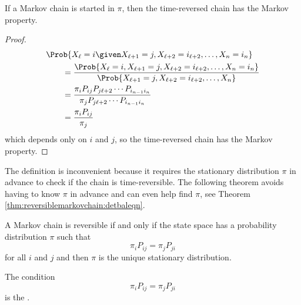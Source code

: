 \documentclass[12pt]{article}
\begin{document}
\begin{proposition}
    If a Markov chain is started in \( \pi \), then the time-reversed
    chain has the Markov property.
\end{proposition}

\begin{proof}
    \begin{align*}
        & \Prob{X_\ell = i \given X_{\ell+1} = j, X_{\ell+2} = i_{\ell+2},
        \dots, X_n = i_n} \\
        &\qquad = \frac{\Prob{X_\ell = i, X_{\ell+1} = j, X_{\ell+2} = i_
        {\ell+2}, \dots, X_n = i_n}}{\Prob{X_{\ell+1} = j, X_{\ell+2} =
        i_{\ell+2}, \dots, X_n}} \\
        &\qquad = \frac{\pi_i P_{ij}P_{j \ell+2}\cdots P_{i_{n-1} i_n}}{\pi_j
        P_{j \ell+2}\cdots P_{i_{n-1} i_n}} \\
        &\qquad = \frac{\pi_i P_{ij}}{\pi_j}
    \end{align*}
    which depends only on \( i \) and \( j \), so the time-reversed
    chain has the Markov property.
\end{proof}

\begin{remark}
    The definition is inconvenient because it requires the stationary
    distribution \( \pi \) in advance to check if the chain is
    time-reversible.  The following theorem avoids having to know \( \pi
    \) in advance and can even help find \( \pi \), see Theorem~%
    \ref{thm:reversiblemarkovchain:detbaleqn}.

\end{remark}
\begin{theorem}
    A Markov chain is reversible if and only if the state space has a
    probability distribution \( \pi \) such that
    \[
        \pi_i P_{ij} = \pi_j P_{ji}
    \] for all \( i \) and \( j \) and then \( \pi \) is the unique
    stationary distribution.
\end{theorem}

\begin{remark}
    The condition
    \[
        \pi_i P_{ij} = \pi_j P_{ji}
    \] is the .%
\end{remark}
\end{document}

